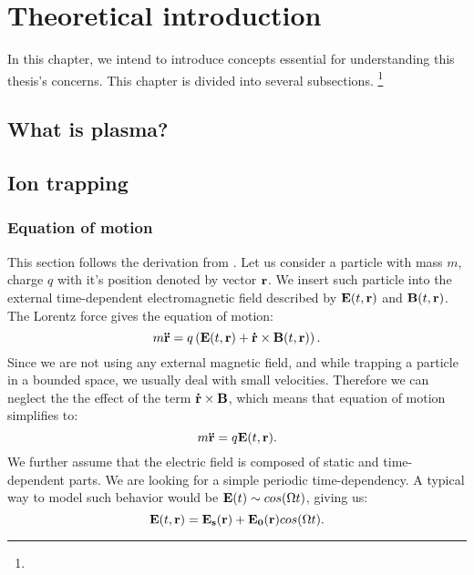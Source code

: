 \chapter{Theoretical introduction}
\label{chap:refs}

In this chapter, we intend to introduce concepts essential for understanding this thesis's concerns. This chapter is divided into several subsections. \footnote{} 

\section{What is plasma?}

\section{Ion trapping}
\subsection{Equation of motion}
This section follows the derivation from \cite{gerlich1992inhomogeneous}.
Let us consider a particle with mass $m$, charge $q$ with it's position denoted by vector $\vb{r}$. We insert such particle into the external time-dependent electromagnetic field described by $\vb{E}(t,\vb{r})$ and $\vb{B}(t,\vb{r})$. The Lorentz force gives the equation of motion:
\begin{equation}
	m \vb{\ddot{r}} = q \left(\vb{E}(t,\vb{r}) + \vb{\dot{r}} \times \vb{B}(t,\vb{r})\right).
\end{equation}
Since we are not using any external magnetic field, and while trapping a particle in a bounded space, we usually deal with small velocities. Therefore we can neglect the the effect of the term $\vb{\dot{r}} \times \vb{B}$, which means that equation of motion simplifies to:
\begin{equation}
	\label{equation of motion}
	m \vb{\ddot{r}} = q \vb{E}(t,\vb{r}).
\end{equation}
We further assume that the electric field is composed of static and time-dependent parts. We are looking for a simple periodic time-dependency. A typical way to model such behavior would be $\vb{E}(t) \sim cos(\Omega t)$, giving us:
\begin{equation}
	\vb{E}(t,\vb{r}) = \vb{E_s}(\vb{r}) + \vb{E_0}(\vb{r}) cos(\Omega t).
\end{equation}
